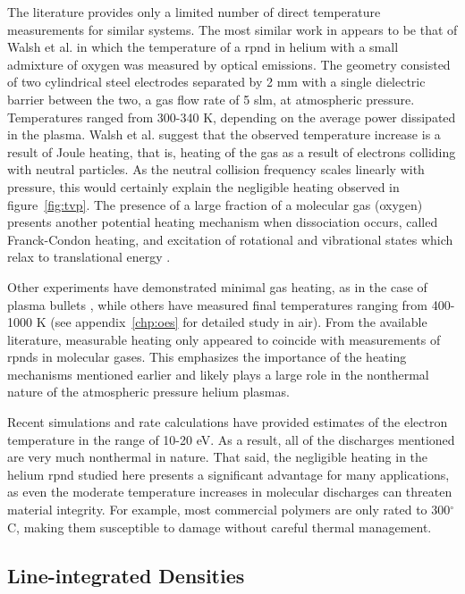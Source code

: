 The literature provides only a limited number of direct temperature measurements
for similar systems. The most similar work in appears to be that of Walsh et al.
\cite{Walsh2010} in which the temperature of a \acs{rpnd} in helium with a small
admixture of oxygen was measured by optical emissions. The geometry consisted of
two cylindrical steel electrodes separated by 2 mm with a single dielectric
barrier between the two, a gas flow rate of 5 slm, at atmospheric pressure.
Temperatures ranged from 300-340 K, depending on the average power dissipated in
the plasma. Walsh et al. suggest that the observed temperature increase is a
result of Joule heating, that is, heating of the gas as a result of electrons
colliding with neutral particles. As the neutral collision frequency scales
linearly with pressure, this would certainly explain the negligible heating
observed in figure~\ref{fig:tvp}. The presence of a large fraction of a
molecular gas (oxygen) presents another potential heating mechanism when
dissociation occurs, called Franck-Condon heating, and excitation of rotational
and vibrational states which relax to translational energy
\cite{Kiehlbauch2003}.

Other experiments have demonstrated minimal gas heating, as in the case of
plasma bullets \cite{Laroussi2005, Lu2006}, while others have measured final
temperatures ranging from 400-1000 K \cite{Pai2009, Popov2011, Zuzeek2011} (see
appendix~\ref{chp:oes} for detailed study in air). From the available
literature, measurable heating only appeared to coincide with measurements of
\acs{rpnd}s in molecular gases. This emphasizes the importance of the heating
mechanisms mentioned earlier and likely plays a large role in the nonthermal
nature of the atmospheric pressure helium plasmas.

Recent simulations and rate calculations \cite{Takashima2011, Aleksandrov2007}
have provided estimates of the electron temperature in the range of 10-20 eV. As
a result, all of the discharges mentioned are very much nonthermal in nature.
That said, the negligible heating in the helium \acs{rpnd} studied here presents
a significant advantage for many applications, as even the moderate temperature
increases in molecular discharges can threaten material integrity. For example,
most commercial polymers are only rated to 300$^\circ$ C, making them
susceptible to damage without careful thermal management.

\subsection{Line-integrated Densities}

